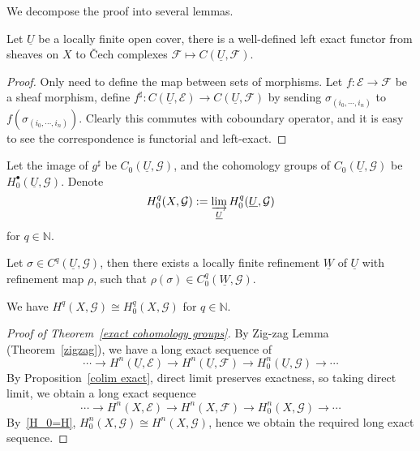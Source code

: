 We decompose the proof into several lemmas.

\begin{lem}
    Let $\underline{U}$ be a locally finite open cover, there is a well-defined left exact functor from sheaves on $X$ to \v{C}ech complexes $\mathcal{F}\mapsto C(\underline{U},\mathcal{F})$.
\end{lem}
\begin{proof}
    Only need to define the map between sets of morphisms.
    Let $f:\mathcal{E}\to\mathcal{F}$ be a sheaf morphism, define $f^\sharp:C(\underline{U},\mathcal{E})\to C(\underline{U},\mathcal{F})$ by sending $\sigma_{(i_0,\cdots,i_n)}$ to $f(\sigma_{(i_0,\cdots,i_n)})$.
    Clearly this commutes with coboundary operator, and it is easy to see the correspondence is functorial and left-exact.
\end{proof}

Let the image of $g^\sharp$ be $C_0(\underline{U},\mathcal{G})$, and the cohomology groups of $C_0(\underline{U},\mathcal{G})$ be $H^\bullet_0(\underline{U},\mathcal{G})$.
Denote
\[H^q_0(X,\mathcal{G}):=\varinjlim_{\underline{U}}H^q_0(\underline{U},\mathcal{G})\]
for $q\in\mathbb{N}$. 

\begin{lem}\label{pre H_0=H}
    Let $\sigma\in C^q(\underline{U},\mathcal{G})$, then there exists a locally finite refinement $\underline{W}$ of $\underline{U}$ with refinement map $\rho$, such that $\rho(\sigma)\in C^q_0(\underline{W},\mathcal{G})$.
\end{lem}

\begin{lem}\label{H_0=H}
    We have $H^q(X,\mathcal{G})\cong H^q_0(X,\mathcal{G})$ for $q\in\mathbb{N}$.
\end{lem}

\begin{proof}[Proof of Theorem~\ref{exact cohomology groups}]
    By Zig-zag Lemma (Theorem~\ref{zigzag}), we have a long exact sequence of
    \[\cdots\to H^n(\underline{U},\mathcal{E})\to H^n(\underline{U},\mathcal{F})\to H^n_0(\underline{U},\mathcal{G})\to\cdots\]
    By Proposition~\ref{colim exact}, direct limit preserves exactness, so taking direct limit, we obtain a long exact sequence
    \[\cdots\to H^n(X,\mathcal{E})\to H^n(X,\mathcal{F})\to H^n_0(X,\mathcal{G})\to\cdots\]
    By~\ref{H_0=H}, $H^n_0(X,\mathcal{G})\cong H^n(X,\mathcal{G})$, hence we obtain the required long exact sequence.
\end{proof}

